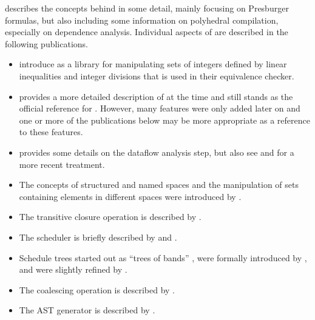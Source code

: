 \textcite{Verdoolaege2016tutorial} describes the concepts behind
\isl in some detail, mainly focusing on Presburger formulas,
but also including some information on polyhedral compilation,
especially on dependence analysis.
Individual aspects of \isl are described in the following publications.
\begin{itemize}
\item
\textcite{Verdoolaege2009equivalence} introduce \isl as a library
for manipulating sets of integers defined by linear inequalities and
integer divisions that is used in their equivalence checker.

\item
\textcite{Verdoolaege2010isl} provides a more detailed description
of \isl at the time and still stands as the official reference for
\isl.  However, many features were only added later on and one or
more of the publications below may be more appropriate as
a reference to these features.

\item
\textcite[Section 5.1]{Verdoolaege2010networks} provides some
details on the dataflow analysis step, but also see
\textcite[Chapter 6]{Verdoolaege2016tutorial} and
\textcite{Verdoolaege2016reordering} for a more recent treatment.

\item The concepts of structured and named spaces and the manipulation
of sets containing elements in different spaces were introduced
by \textcite{Verdoolaege2011iscc}.

\item The transitive closure operation is described
by \textcite{Verdoolaege2011closure}.

\item The scheduler is briefly described by
\textcite[Section 6.2]{Verdoolaege2013PPCG} and
\textcite[Section 2.4]{Verdoolaege2016reordering}.

\item Schedule trees started out as ``trees of bands''
\parencite[Section 6.2]{Verdoolaege2013PPCG}, were formally
introduced by \textcite{Verdoolaege2014impact}, and were
slightly refined by \textcite{Grosser2015AST}.

\item The coalescing operation is described by
\textcite{Verdoolaege2015impact}.

\item The AST generator is described by \textcite{Grosser2015AST}.

\end{itemize}
